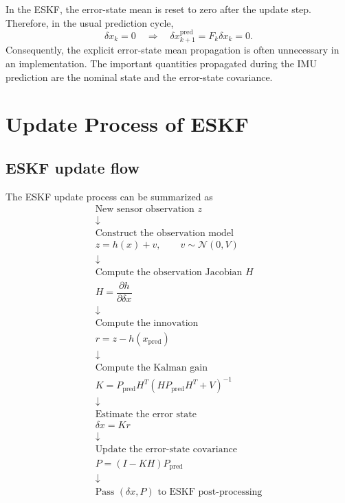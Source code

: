 \documentclass[11pt]{article}
\numberwithin{equation}{section}
\begin{document}
In the ESKF, the error-state mean is reset to zero after the update
step.  Therefore, in the usual prediction cycle,
\[
\delta x_k=0
\quad\Longrightarrow\quad
\delta x_{k+1}^{\mathrm{pred}}
=
F_k\delta x_k
=
0.
\]
Consequently, the explicit error-state mean propagation is often
unnecessary in an implementation.  The important quantities propagated
during the IMU prediction are the nominal state and the error-state
covariance.


\section{Update Process of ESKF}

\subsection{ESKF update flow}

The ESKF update process can be summarized as
\[
\boxed{
\begin{array}{c}
\text{New sensor observation }z
\\[2mm]
\downarrow
\\[2mm]
\text{Construct the observation model}
\\
z=h(x)+v,\qquad v\sim\mathcal N(0,V)
\\[2mm]
\downarrow
\\[2mm]
\text{Compute the observation Jacobian }H
\\
H=\dfrac{\partial h}{\partial\delta x}
\\[2mm]
\downarrow
\\[2mm]
\text{Compute the innovation}
\\
r=z-h(x_{\mathrm{pred}})
\\[2mm]
\downarrow
\\[2mm]
\text{Compute the Kalman gain}
\\
K=P_{\mathrm{pred}}H^T
\left(
HP_{\mathrm{pred}}H^T+V
\right)^{-1}
\\[2mm]
\downarrow
\\[2mm]
\text{Estimate the error state}
\\
\delta x=Kr
\\[2mm]
\downarrow
\\[2mm]
\text{Update the error-state covariance}
\\
P=(I-KH)P_{\mathrm{pred}}
\\[2mm]
\downarrow
\\[2mm]
\text{Pass }(\delta x,P)\text{ to ESKF post-processing}
\end{array}
}
\]
\end{document}
